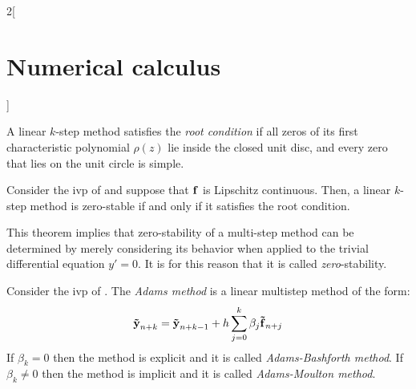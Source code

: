 \documentclass[../../../main_math.tex]{subfiles}
\begin{document}
\begin{multicols}{2}[\section{Numerical calculus}]
  \begin{definition}
    A linear $k$-step method satisfies the \emph{root condition} if all zeros of its first characteristic polynomial $\rho(z)$ lie inside the closed unit disc, and every zero that lies on the unit circle is simple.
  \end{definition}
  \begin{theorem}
    Consider the ivp of  and suppose that $\boldsymbol{\mathrm{f}}$ is Lipschitz continuous. Then, a linear $k$-step method is zero-stable if and only if it satisfies the root condition.
  \end{theorem}
  \begin{remark}
    This theorem implies that zero-stability of a multi-step method can be determined by merely considering its behavior when applied to the trivial differential equation $y'=0$. It is for this reason that it is called \textit{zero}-stability.
  \end{remark}
  \begin{definition}
    Consider the ivp of . The \emph{Adams method} is a linear multistep method of the form:
    \begin{equation}\label{NC:Adams}
      \boldsymbol{\mathrm{\tilde{y}}}_{n+k}=\boldsymbol{\mathrm{\tilde{y}}}_{n+k-1}+h\sum_{j=0}^{k}\beta_j\boldsymbol{\mathrm{\tilde{f}}}_{n+j}
    \end{equation}
    If $\beta_{k}=0$ then the method is explicit and it is called \emph{Adams-Bashforth method}. If $\beta_{k}\ne 0$ then the method is implicit and it is called \emph{Adams-Moulton method}.


\end{definition}
\end{multicols}
\end{document}

